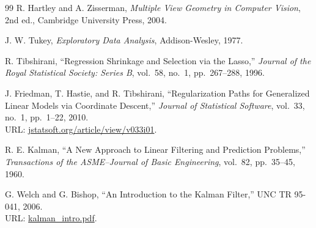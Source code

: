 \documentclass[10pt,a4paper]{article}
\begin{document}
\begin{thebibliography}{99}
R. Hartley and A. Zisserman, \emph{Multiple View Geometry in Computer Vision}, 2nd ed., Cambridge University Press, 2004.

J. W. Tukey, \emph{Exploratory Data Analysis}, Addison-Wesley, 1977.

R. Tibshirani, ``Regression Shrinkage and Selection via the Lasso,'' \emph{Journal of the Royal Statistical Society: Series B}, vol.~58, no.~1, pp.~267--288, 1996.

J. Friedman, T. Hastie, and R. Tibshirani, ``Regularization Paths for Generalized Linear Models via Coordinate Descent,'' \emph{Journal of Statistical Software}, vol.~33, no.~1, pp.~1--22, 2010.\\
URL: \href{https://www.jstatsoft.org/article/view/v033i01}{jstatsoft.org/article/view/v033i01}.

R. E. Kalman, ``A New Approach to Linear Filtering and Prediction Problems,'' \emph{Transactions of the ASME--Journal of Basic Engineering}, vol.~82, pp.~35--45, 1960.

G. Welch and G. Bishop, ``An Introduction to the Kalman Filter,'' UNC TR 95-041, 2006.\\
URL: \href{https://www.cs.unc.edu/~welch/media/pdf/kalman_intro.pdf}{kalman\_intro.pdf}.
\end{thebibliography}
\end{document}
